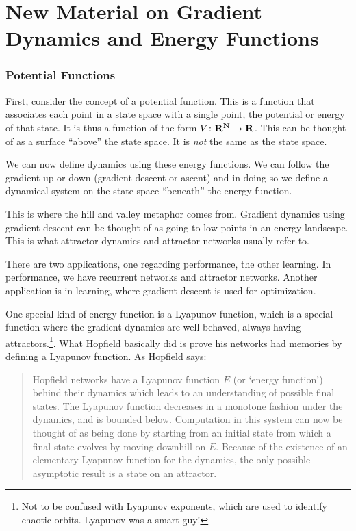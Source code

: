 \chapter{New Material on Gradient Dynamics and Energy Functions}


\subsection{Potential Functions}

First, consider the concept of a potential function. This is a function that associates each point in a state space with a single point, the potential or energy of that state.  It is thus a function of the form $V \colon \bf{R}^N \to
\bf{R}$.  This can be thought of as a surface ``above'' the state space. It is \emph{not} the same as the state space. 

We can now define dynamics using these energy functions. We can follow the gradient up or down (gradient descent or ascent) and in doing so we define a dynamical system on the state space ``beneath'' the energy function.

This is where the hill and valley metaphor comes from. Gradient dynamics using gradient descent can be thought of as going to low points in an energy landscape.  This is what attractor dynamics and attractor networks usually refer to.

There are two applications, one regarding performance, the other learning. In performance, we have recurrent networks and attractor networks. Another application is in learning, where gradient descent is used for optimization.

One special kind of energy function is a Lyapunov function, which is a special function where the gradient dynamics are well behaved, always having attractors.\footnote{Not to be confused with Lyapunov exponents, which are used to identify chaotic orbits. Lyapunov was a smart guy!}.  What Hopfield basically did is prove his networks had memories by defining a Lyapunov function. As Hopfield says:

\begin{quote}
Hopfield networks have a Lyapunov function $E$ (or `energy function') behind their dynamics which leads to an understanding of possible final states. The Lyapunov function decreases in a monotone fashion under the dynamics, and is bounded below. Computation in this system can now be thought of as being done by starting from an initial state from which a final state evolves by moving downhill on $E$. Because of the existence of an elementary Lyapunov function for the dynamics, the only possible asymptotic result is a state on an attractor.
\end{quote}

